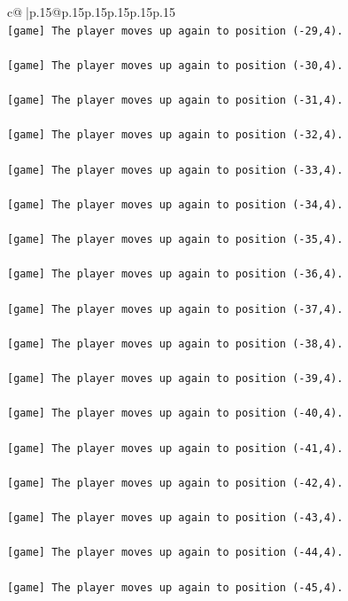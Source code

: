 \documentclass{article}
\begin{document}
{\begin{supertabular}{c@{$\;$}|p{.15\linewidth}@{}p{.15\linewidth}p{.15\linewidth}p{.15\linewidth}p{.15\linewidth}p{.15\linewidth}}
{{{\\ 
\texttt{{[}game{]} The player moves up again to position ({-}29,4).} \\
\\ 
\texttt{{[}game{]} The player moves up again to position ({-}30,4).} \\
\\ 
\texttt{{[}game{]} The player moves up again to position ({-}31,4).} \\
\\ 
\texttt{{[}game{]} The player moves up again to position ({-}32,4).} \\
\\ 
\texttt{{[}game{]} The player moves up again to position ({-}33,4).} \\
\\ 
\texttt{{[}game{]} The player moves up again to position ({-}34,4).} \\
\\ 
\texttt{{[}game{]} The player moves up again to position ({-}35,4).} \\
\\ 
\texttt{{[}game{]} The player moves up again to position ({-}36,4).} \\
\\ 
\texttt{{[}game{]} The player moves up again to position ({-}37,4).} \\
\\ 
\texttt{{[}game{]} The player moves up again to position ({-}38,4).} \\
\\ 
\texttt{{[}game{]} The player moves up again to position ({-}39,4).} \\
\\ 
\texttt{{[}game{]} The player moves up again to position ({-}40,4).} \\
\\ 
\texttt{{[}game{]} The player moves up again to position ({-}41,4).} \\
\\ 
\texttt{{[}game{]} The player moves up again to position ({-}42,4).} \\
\\ 
\texttt{{[}game{]} The player moves up again to position ({-}43,4).} \\
\\ 
\texttt{{[}game{]} The player moves up again to position ({-}44,4).} \\
\\ 
\texttt{{[}game{]} The player moves up again to position ({-}45,4).} \\
}}}
\end{supertabular}}
\end{document}
